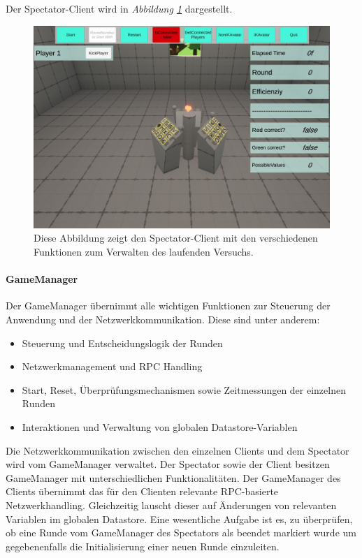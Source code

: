 \documentclass[a4paper,11pt]{article}%
\renewcommand{\\}{\vspace*{0.5\baselineskip} \newline}
\begin{document}
{Der Spectator-Client wird in \textit{Abbildung \ref{SpectatorView}} dargestellt.

\begin{figure}[H]
		\begin{footnotesize}
		\centering
			\includegraphics[scale=0.3]{Abbildungen/Versuchsumgebung/SpectatorView.JPG}
			\caption[Der Spectatorview]{Diese Abbildung zeigt den Spectator-Client mit den verschiedenen Funktionen zum Verwalten des laufenden Versuchs.}
			\label{SpectatorView}
		\end{footnotesize}
	\end{figure}
	
\paragraph{GameManager}
Der GameManager übernimmt alle wichtigen Funktionen zur Steuerung der Anwendung und der Netzwerkkommunikation.
Diese sind unter anderem:
\begin{itemize}[itemsep=0cm]
\item Steuerung und Entscheidungslogik der Runden
\item Netzwerkmanagement und RPC Handling
\item Start, Reset, Überprüfungsmechanismen sowie Zeitmessungen der einzelnen Runden
\item Interaktionen und Verwaltung von globalen Datastore-Variablen
\end{itemize}

Die Netzwerkkommunikation zwischen den einzelnen Clients und dem Spectator wird vom GameManager verwaltet. Der Spectator sowie der Client besitzen GameManager mit unterschiedlichen Funktionalitäten. Der GameManager des Clients übernimmt das für den Clienten relevante RPC-basierte Netzwerkhandling. Gleichzeitig lauscht dieser auf Änderungen von relevanten Variablen im globalen Datastore. Eine wesentliche Aufgabe ist es, zu überprüfen, ob eine Runde vom GameManager des Spectators als beendet markiert wurde um gegebenenfalls die Initialisierung einer neuen Runde einzuleiten.

}
\end{document}
